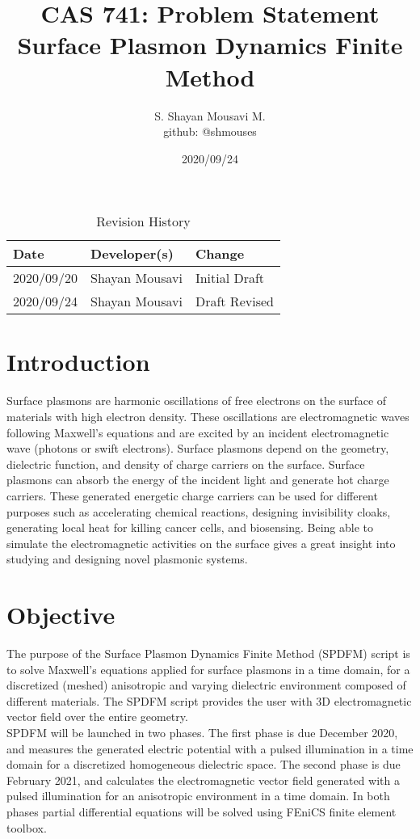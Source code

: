 \documentclass{article}
\title{CAS 741: Problem Statement\\Surface Plasmon Dynamics Finite Method}
\author{S. Shayan Mousavi M.\\github: @shmouses}
\date{2020/09/24}
\begin{document}
\maketitle
\clearpage


\begin{table}[hp]
\caption{Revision History} \label{TblRevisionHistory}
\begin{tabularx}{\textwidth}{llX}
\toprule
\textbf{Date} & \textbf{Developer(s)} & \textbf{Change}\\
\midrule
2020/09/20 & Shayan Mousavi & Initial Draft\\
2020/09/24 & Shayan Mousavi & Draft Revised\\
\bottomrule
\end{tabularx}
\end{table}



\clearpage


\newpage


\newcommand*\apos{\textsc{\char13}}
\section{Introduction}

Surface plasmons are harmonic oscillations of free electrons on the surface of 
materials with high electron density. These oscillations are electromagnetic 
waves following Maxwell's equations and are excited by an incident 
electromagnetic wave (photons or swift electrons). Surface plasmons depend on 
the geometry, dielectric function, and density of charge carriers on the 
surface.
Surface plasmons can absorb the energy of the incident light and generate hot 
charge carriers. These generated energetic charge carriers can be used for 
different purposes such as accelerating chemical reactions, designing 
invisibility cloaks, generating local heat for killing cancer cells, and 
biosensing. Being able to simulate the electromagnetic activities on the surface 
gives a great insight into studying and designing novel plasmonic systems.  
  
  
\section{Objective}

The purpose of the Surface Plasmon Dynamics Finite Method (SPDFM) script is to
solve Maxwell's equations applied for surface plasmons in a time domain, for a
discretized (meshed) anisotropic and varying dielectric environment composed of
different materials. The SPDFM script provides the user with 3D
electromagnetic vector field over the entire geometry. \\
SPDFM will be launched in two phases. The first phase is due December 2020, and measures the generated electric potential with a pulsed illumination in a time domain for a discretized homogeneous dielectric space. The second phase is due February 2021, and calculates the electromagnetic vector field generated with a pulsed illumination for an anisotropic environment in a time domain. In both phases partial differential equations will be solved using FEniCS finite element toolbox.    
\end{document}
